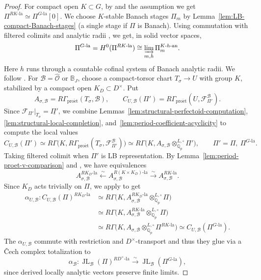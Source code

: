 \documentclass[11pt]{article}
\theoremstyle{definition}
\newcommand{\Qp}{\mathbb Q_p}
\newcommand{\cF}{\mathcal F}
\newcommand{\la}{\mathrm{la}}
\newcommand{\an}{\mathrm{an}}
\newcommand{\proet}{\mathrm{pro\acute et}}
\newcommand{\JL}{\operatorname{JL}}
\begin{document}
\begin{proof}
For compact open \(K\subset G\), by
\cite[Proposition~3.2.6(1)]{RJRCSolid} and the assumption we get
\(\Pi^{RK\text{-}\la}\simeq\Pi^{G\text{-}\la}[0]\).
We choose \(K\)-stable Banach stages \(\Pi_m\) by
Lemma~\ref{lem:LB-compact-Banach-stages} (a single stage if \(\Pi\) is Banach).
Using commutation with filtered colimits and analytic radii
\cite[Proposition~3.2.6(3)--(4) and Corollary~3.2.14(2)]{RJRCSolid},
we get, in solid vector spaces,
\[
 \Pi^{G\text{-}\la}=H^0(\Pi^{RK\text{-}\la})
 \cong\varinjlim_{m,h}\Pi_m^{K\text{-}h\text{-}\an}.
\]
Here \(h\) runs through a countable cofinal system of Banach analytic
radii.  
We follow \cite[proof of Theorem~7.2.1, Step~3]{DRC}.
For \(\mathscr B=\widehat{\mathscr O}\) or \(\mathbb B_J\),
choose a compact-torsor chart \(T_\sigma\to U\) with group
\(K\), stabilized by a compact open \(K_D\subset D^\times\).
Put
\[
 A_{\sigma,\mathscr B}=R\Gamma_{\proet}(T_\sigma,\mathscr B),\qquad
 C_{U,\mathscr B}(\Pi')=R\Gamma_{\proet}(U,\cF_{\Pi'}^{\mathscr B}).
\]
Since \(\cF_{\Pi'}|_{T_\sigma}=\underline{\Pi'}\),
we combine Lemmas~\ref{lem:structural-perfectoid-computation},
\ref{lem:structural-local-completion},
and~\ref{lem:period-coefficient-acyclicity} to compute the local values
\[
 C_{U,\mathscr B}(\Pi')\simeq R\Gamma\bigl(K,R\Gamma_{\proet}(T_\sigma, \cF_{\Pi'}^{\mathscr{B}})\bigr)\simeq
 R\Gamma\bigl(K,A_{\sigma,\mathscr B}\otimes_{\Qp}^{L,\square}\Pi'\bigr),
 \qquad \Pi'=\Pi,\ \Pi^{G\text{-}\la}.
\]
Taking filtered colimit when $\Pi'$ is LB representation.
By Lemma~\ref{lem:period-proet-v-comparison} and
\cite[Theorem~6.1.1]{DRC}, we have equivalences
\[
 A_{\sigma,\mathscr B}^{RK_D\text{-}\la}
 \xleftarrow{\sim}A_{\sigma,\mathscr B}^{R(K\times K_D)\text{-}\la}
 \xrightarrow{\sim}A_{\sigma,\mathscr B}^{RK\text{-}\la}.
\]
Since \(K_D\) acts trivially on \(\Pi\), we apply
\cite[Corollary~3.2.14(3) and Theorem~6.3.4]{RJRCSolid} to get
\begin{align*}
 \alpha_{U, \mathscr{B}}\colon C_{U,\mathscr B}(\Pi)^{RK_D\text{-}\la}
 &\simeq R\Gamma\bigl(K,
 A_{\sigma,\mathscr B}^{RK_D\text{-}\la}\otimes_{\Qp}^{L,\square}\Pi\bigr)\\
 &\simeq R\Gamma\bigl(K,
 A_{\sigma,\mathscr B}^{RK\text{-}\la}\otimes_{\Qp}^{L,\square}\Pi\bigr)\\
 &\simeq R\Gamma\bigl(K,
 A_{\sigma,\mathscr B}\otimes_{\Qp}^{L,\square}\Pi^{RK\text{-}\la}\bigr)
 \simeq C_{U,\mathscr B}(\Pi^{G\text{-}\la}).
\end{align*}
The \(\alpha_{U,\mathscr B}\) commute with restriction and
\(D^\times\)-transport and thus they glue via a \v Cech complex totalization to
\[
 \alpha_{\mathscr B}:\JL_{\mathscr B}(\Pi)^{RD^\times\text{-}\la}
 \xrightarrow{\sim}\JL_{\mathscr B}(\Pi^{G\text{-}\la}),
\]
since derived locally analytic vectors preserve finite limits.


\end{proof}
\end{document}
